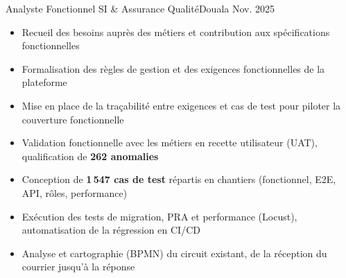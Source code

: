 %
%
%


\begin{experiences}
     {Analyste Fonctionnel SI \& Assurance Qualité}{}{Douala}
    {Nov. 2025} {
                      \begin{itemize}
                        \item Recueil des besoins auprès des métiers et contribution aux spécifications fonctionnelles
                        \item Formalisation des règles de gestion et des exigences fonctionnelles de la plateforme
                        \item Mise en place de la traçabilité entre exigences et cas de test pour piloter la couverture fonctionnelle
                        \item Validation fonctionnelle avec les métiers en recette utilisateur (UAT), qualification de \textbf{262 anomalies}
                        \item Conception de \textbf{1\,547 cas de test} répartis en chantiers (fonctionnel, E2E, API, rôles, performance)
                        \item Exécution des tests de migration, PRA et performance (Locust), automatisation de la régression en CI/CD
                      \end{itemize}
                      \begin{itemize}
                        \item Analyse et cartographie (BPMN) du circuit existant, de la réception du courrier jusqu'à la réponse

\end{itemize}}
\end{experiences}
